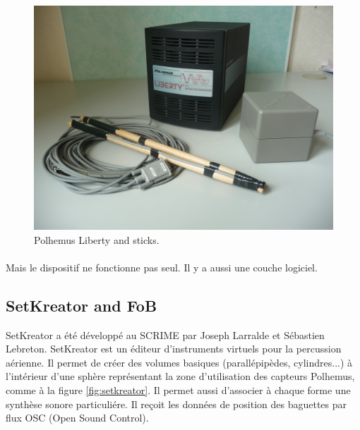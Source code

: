 \begin{figure}[h!]
\centering\includegraphics[scale=0.11]{image/percu.jpg}
\caption{Polhemus Liberty and sticks.}
\label{fig:percu}
\end{figure}

\paragraph{}
Mais le dispositif ne fonctionne pas seul. Il y a aussi une couche logiciel.

\subsection{SetKreator and FoB}

SetKreator a été développé au \ac{SCRIME} par Joseph Larralde et Sébastien Lebreton. SetKreator est un éditeur d'instruments virtuels pour la percussion aérienne. Il permet de créer des volumes basiques (parallépipèdes, cylindres...) à l'intérieur d'une sphère représentant la zone d'utilisation des capteurs Polhemus, comme à la figure \ref{fig:setkreator}. Il permet aussi d'associer à chaque forme une synthèse sonore particuliére. Il reçoit les données de position des baguettes par flux OSC (Open Sound Control).

